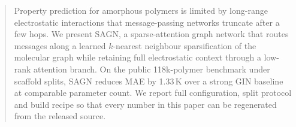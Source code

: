 \begin{abstract}
Property prediction for amorphous polymers is limited by long-range electrostatic
interactions that message-passing networks truncate after a few hops. We present
SAGN, a sparse-attention graph network that routes messages along a learned
$k$-nearest neighbour sparsification of the molecular graph while retaining full
electrostatic context through a low-rank attention branch. On the public
118k-polymer benchmark under scaffold splits, SAGN reduces MAE by 1.33\,K over a
strong GIN baseline at comparable parameter count. We report full configuration,
split protocol and build recipe so that every number in this paper can be
regenerated from the released source.
\end{abstract}
